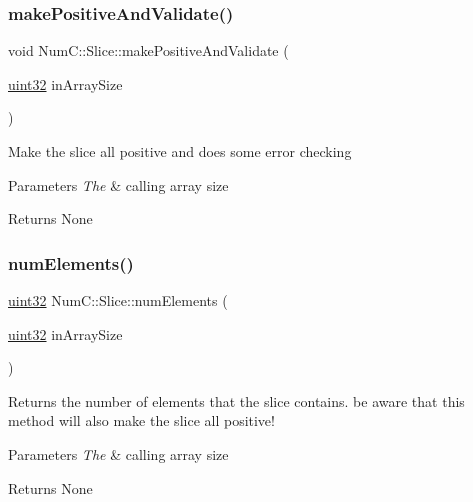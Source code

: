 \subsubsection{\texorpdfstring{make\+Positive\+And\+Validate()}{makePositiveAndValidate()}}
{\footnotesize\ttfamily void Num\+C\+::\+Slice\+::make\+Positive\+And\+Validate (\begin{DoxyParamCaption}\item[{\mbox{\hyperlink{namespace_num_c_ae685802ca6d3035f2b400b081e3953fa}{uint32}}}]{in\+Array\+Size }\end{DoxyParamCaption})\hspace{0.3cm}{\ttfamily [inline]}}

Make the slice all positive and does some error checking


\begin{DoxyParams}{Parameters}
{\em The} & calling array size\\
\hline
\end{DoxyParams}
\begin{DoxyReturn}{Returns}
None 
\end{DoxyReturn}
\mbox{\label{class_num_c_1_1_slice_aed7a6610a9c98c8b41f336fc8f71d94c}} 
\subsubsection{\texorpdfstring{num\+Elements()}{numElements()}}
{\footnotesize\ttfamily \mbox{\hyperlink{namespace_num_c_ae685802ca6d3035f2b400b081e3953fa}{uint32}} Num\+C\+::\+Slice\+::num\+Elements (\begin{DoxyParamCaption}\item[{\mbox{\hyperlink{namespace_num_c_ae685802ca6d3035f2b400b081e3953fa}{uint32}}}]{in\+Array\+Size }\end{DoxyParamCaption})\hspace{0.3cm}{\ttfamily [inline]}}

Returns the number of elements that the slice contains. be aware that this method will also make the slice all positive!


\begin{DoxyParams}{Parameters}
{\em The} & calling array size\\
\hline
\end{DoxyParams}
\begin{DoxyReturn}{Returns}
None 
\end{DoxyReturn}
\mbox{\label{class_num_c_1_1_slice_aa5c337ad7e0b8606fdde5227b00fe8e9}} 
